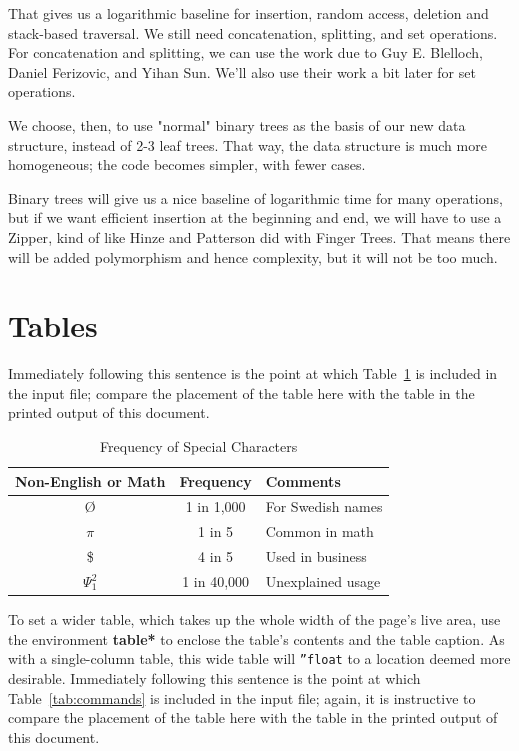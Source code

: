 \documentclass[sigconf]{acmart}
\begin{document}
That gives us a logarithmic baseline for insertion, random access, deletion and
stack-based traversal. We still need concatenation, splitting, and set
operations. For concatenation and splitting, we can use the work due to Guy E.
Blelloch, Daniel Ferizovic, and Yihan Sun\cite{10.1145/3512769}. We'll also use
their work a bit later for set operations\cite{DBLP:journals/corr/BlellochFS16}.

We choose, then, to use "normal" binary trees as the
basis of our new data structure, instead of 2-3 leaf trees. That way, the data
structure is much more homogeneous; the code becomes simpler, with fewer cases.

Binary trees will give us a nice baseline of logarithmic time for many
operations, but if we want efficient insertion at the beginning and end, we will
have to use a Zipper\cite{HUET_1997}, kind of like Hinze and
Patterson\cite{Hinze-Paterson:FingerTree} did with Finger Trees. That means
there will be added polymorphism and hence complexity, but it will not be too
much.



\section{Tables}


Immediately following this sentence is the point at which
Table~\ref{tab:freq} is included in the input file; compare the
placement of the table here with the table in the printed output of
this document.

\begin{table}
  \caption{Frequency of Special Characters}
  \label{tab:freq}
  \begin{tabular}{ccl}
    \toprule
    Non-English or Math&Frequency&Comments\\
    \midrule
    \O & 1 in 1,000& For Swedish names\\
    $\pi$ & 1 in 5& Common in math\\
    \$ & 4 in 5 & Used in business\\
    $\Psi^2_1$ & 1 in 40,000& Unexplained usage\\
  \bottomrule
\end{tabular}
\end{table}

To set a wider table, which takes up the whole width of the page's
live area, use the environment \textbf{table*} to enclose the table's
contents and the table caption.  As with a single-column table, this
wide table will \texttt{''float} to a location deemed more
desirable. Immediately following this sentence is the point at which
Table~\ref{tab:commands} is included in the input file; again, it is
instructive to compare the placement of the table here with the table
in the printed output of this document.
\end{document}
